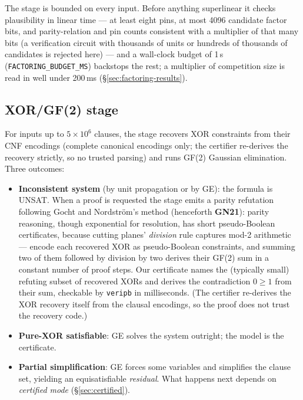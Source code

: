 \documentclass[10pt]{article}
\begin{document}
The stage is bounded on every input. Before anything superlinear it
checks plausibility in linear time --- at least eight pins, at most 4096
candidate factor bits, and parity-relation and pin counts consistent
with a multiplier of that many bits (a verification circuit with
thousands of units or hundreds of thousands of candidates is rejected
here) --- and a wall-clock budget of 1\,s
(\texttt{FACTORING\_BUDGET\_MS}) backstops the rest; a multiplier of
competition size is read in well under 200\,ms
(\S\ref{sec:factoring-results}).

\subsection{XOR/GF(2) stage}
\label{sec:xor}

For inputs up to $5\times 10^6$ clauses, the stage recovers XOR
constraints from their CNF encodings (complete canonical encodings
only; the certifier re-derives the recovery strictly, so no trusted
parsing) and runs GF(2) Gaussian elimination. Three outcomes:

\begin{itemize}
\item \textbf{Inconsistent system} (by unit propagation or by GE): the
  formula is UNSAT. When a proof is requested the stage emits a
  parity refutation following Gocht and Nordstr\"om's method
  \cite{gn21} (henceforth \textbf{GN21}): parity reasoning, though
  exponential for resolution, has short pseudo-Boolean certificates,
  because cutting planes' \emph{division} rule captures mod-2
  arithmetic --- encode each recovered XOR as pseudo-Boolean
  constraints, and summing two of them followed by division by two
  derives their GF(2) sum in a constant number of proof steps. Our
  certificate names the (typically small) refuting subset of
  recovered XORs and derives the contradiction $0 \geq 1$ from their
  sum, checkable by \texttt{veripb} in milliseconds. (The certifier
  re-derives the XOR recovery itself from the clausal encodings, so
  the proof does not trust the recovery code.)
\item \textbf{Pure-XOR satisfiable}: GE solves the system outright;
  the model is the certificate.
\item \textbf{Partial simplification}: GE forces some variables and
  simplifies the clause set, yielding an equisatisfiable
  \emph{residual}. What happens next depends on \emph{certified mode}
  (\S\ref{sec:certified}).
\end{itemize}
\end{document}
